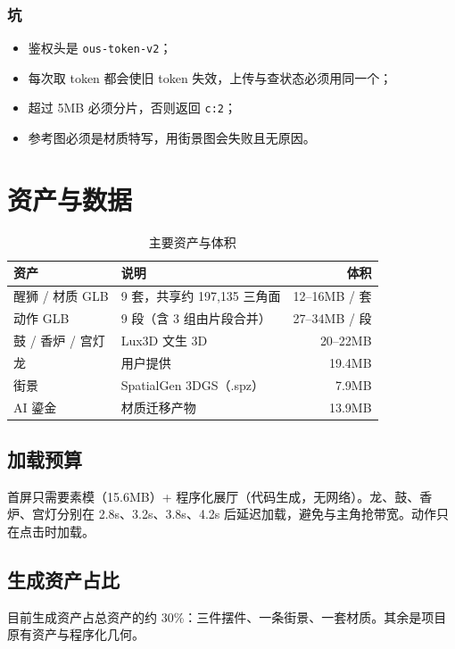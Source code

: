 \documentclass[UTF8,a4paper,11pt]{ctexart}
\begin{document}
\subsubsection{坑}
\begin{itemize}[itemsep=2pt]
  \item 鉴权头是 \texttt{ous-token-v2}；
  \item 每次取 token 都会使旧 token 失效，上传与查状态必须用同一个；
  \item 超过 5MB 必须分片，否则返回 \texttt{c:2}；
  \item 参考图必须是材质特写，用街景图会失败且无原因。
\end{itemize}

\section{资产与数据}

\begin{table}[H]
\centering
\small
\caption{主要资产与体积}
\begin{tabular}{@{}llr@{}}
\toprule
资产 & 说明 & 体积 \\
\midrule
醒狮 / 材质 GLB & 9 套，共享约 197{,}135 三角面 & 12--16MB / 套 \\
动作 GLB & 9 段（含 3 组由片段合并） & 27--34MB / 段 \\
鼓 / 香炉 / 宫灯 & Lux3D 文生 3D & 20--22MB \\
龙 & 用户提供 & 19.4MB \\
街景 & SpatialGen 3DGS（.spz） & 7.9MB \\
AI 鎏金 & 材质迁移产物 & 13.9MB \\
\bottomrule
\end{tabular}
\end{table}

\subsection{加载预算}
首屏只需要素模（15.6MB）+ 程序化展厅（代码生成，无网络）。龙、鼓、香炉、宫灯分别在 2.8s、3.2s、3.8s、4.2s 后延迟加载，避免与主角抢带宽。动作只在点击时加载。

\subsection{生成资产占比}
目前生成资产占总资产的约 30\%：三件摆件、一条街景、一套材质。其余是项目原有资产与程序化几何。
\end{document}
